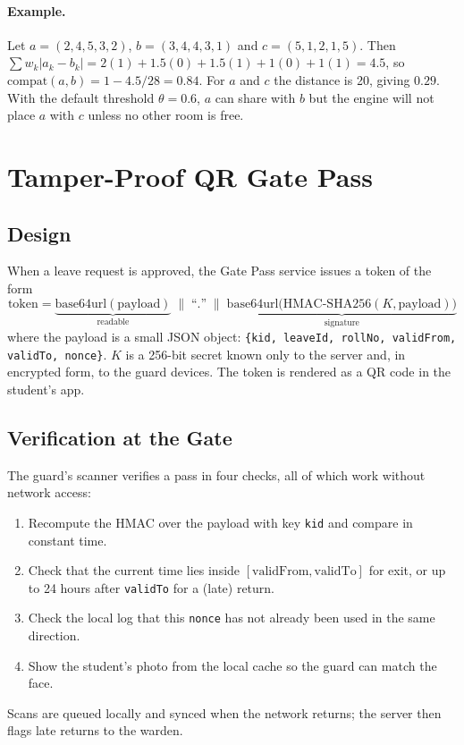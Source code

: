 \documentclass[11pt,a4paper]{report}
\begin{document}
\paragraph{Example.} Let $a = (2,4,5,3,2)$, $b = (3,4,4,3,1)$ and $c = (5,1,2,1,5)$. Then $\sum w_k|a_k-b_k| = 2(1)+1.5(0)+1.5(1)+1(0)+1(1) = 4.5$, so $\text{compat}(a,b) = 1 - 4.5/28 = 0.84$. For $a$ and $c$ the distance is 20, giving $0.29$. With the default threshold $\theta = 0.6$, $a$ can share with $b$ but the engine will not place $a$ with $c$ unless no other room is free.

\section{Tamper-Proof QR Gate Pass}\label{sec:qr}
\subsection{Design}
When a leave request is approved, the Gate Pass service issues a token of the form
\[
\text{token} = \underbrace{\text{base64url}(\text{payload})}_{\text{readable}} \;\|\; \text{``.''} \;\|\; \underbrace{\text{base64url}\big(\text{HMAC-SHA256}(K, \text{payload})\big)}_{\text{signature}}
\]
where the payload is a small JSON object: \texttt{\{kid, leaveId, rollNo, validFrom, validTo, nonce\}}. $K$ is a 256-bit secret known only to the server and, in encrypted form, to the guard devices. The token is rendered as a QR code in the student's app.

\subsection{Verification at the Gate}
The guard's scanner verifies a pass in four checks, all of which work without network access:
\begin{enumerate}
  \item Recompute the HMAC over the payload with key \texttt{kid} and compare in constant time.
  \item Check that the current time lies inside $[\text{validFrom}, \text{validTo}]$ for exit, or up to 24 hours after \texttt{validTo} for a (late) return.
  \item Check the local log that this \texttt{nonce} has not already been used in the same direction.
  \item Show the student's photo from the local cache so the guard can match the face.
\end{enumerate}
Scans are queued locally and synced when the network returns; the server then flags late returns to the warden.
\end{document}
